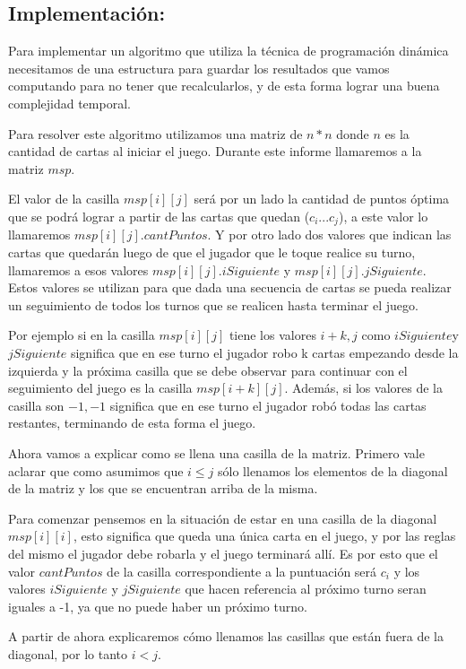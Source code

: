 \subsection{Implementación:}

Para implementar un algoritmo que utiliza la técnica de programación dinámica necesitamos de una estructura para guardar los resultados que vamos computando para no tener que recalcularlos, y de esta forma lograr una buena complejidad temporal.

Para resolver este algoritmo utilizamos una matriz de $n * n$ donde $n$ es la cantidad de cartas al iniciar el juego. Durante este informe llamaremos a la matriz $msp$.

El valor de la casilla $msp[i][j]$ será por un lado la cantidad de puntos óptima que se podrá lograr a partir de las cartas que quedan ($c_i ... c_j$), a este valor lo llamaremos $msp[i][j].cantPuntos$. Y por otro lado dos valores que indican las cartas que quedarán luego de que el jugador que le toque realice su turno, llamaremos a esos valores $msp[i][j].iSiguiente$ y $msp[i][j].jSiguiente$. Estos valores se utilizan para que dada una secuencia de cartas se pueda realizar un seguimiento de todos los turnos que se realicen hasta terminar el juego.

Por ejemplo si en la casilla $msp[i][j]$ tiene los valores $i+k, j$ como $iSiguiente $y$ jSiguiente$ significa que en ese turno el jugador robo k cartas empezando desde la izquierda y la próxima casilla que se debe observar para continuar con el seguimiento del juego es la casilla $msp[i+k][j]$. Además, si los valores de la casilla son $-1, -1$ significa que en ese turno el jugador robó todas las cartas restantes, terminando de esta forma el juego.

Ahora vamos a explicar como se llena una casilla de la matriz. Primero vale aclarar que como asumimos que $i \leq j$ sólo llenamos los elementos de la diagonal de la matriz y los que se encuentran arriba de la misma.

Para comenzar pensemos en la situación de estar en una casilla de la diagonal $msp[i][i]$, esto significa que queda una única carta en el juego, y por las reglas del mismo el jugador debe robarla y el juego terminará allí. Es por esto que el valor $cantPuntos$ de la casilla correspondiente a la puntuación será $c_i$ y los valores $iSiguiente$ y $jSiguiente$ que hacen referencia al próximo turno seran iguales a -1, ya que no puede haber un próximo turno.

A partir de ahora explicaremos cómo llenamos las casillas que están fuera de la diagonal, por lo tanto $i < j$.

